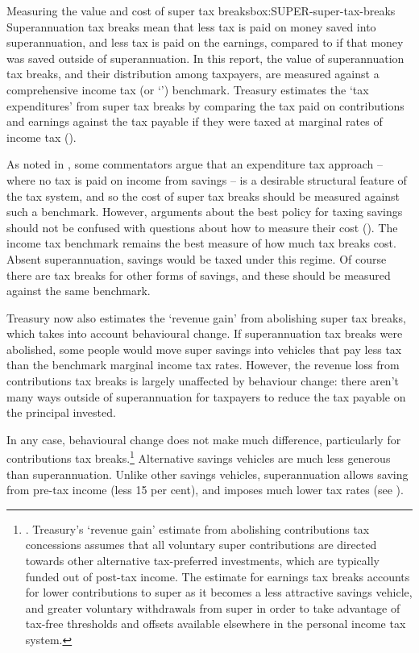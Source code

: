 \begin{smallbox}[tp]{Measuring the value and cost of super tax breaks}{box:SUPER-super-tax-breaks}
Superannuation tax breaks mean that less tax is paid on money saved into superannuation, and less tax is paid on the earnings, compared to if that money was saved outside of superannuation. In this report, the value of superannuation tax breaks, and their distribution among taxpayers, are measured against a comprehensive income tax (or ‘\TTE’) benchmark. Treasury estimates the ‘tax expenditures’ from super tax breaks by comparing the tax paid on contributions and earnings against the tax payable if they were taxed at marginal rates of income tax (\textcite{Treasury2015TES2014}). 

As noted in , some commentators argue that an expenditure tax approach – where no tax is paid on income from savings – is a desirable structural feature of the tax system, and so the cost of super tax breaks should be measured against such a benchmark. However, arguments about the best policy for taxing savings should not be confused with questions about how to measure their cost (\textcite{DaleyWoodCoates2015}). The income tax benchmark remains the best measure of how much tax breaks cost. Absent superannuation, savings would be taxed under this regime. Of course there are tax breaks for other forms of savings, and these should be measured against the same benchmark. 

Treasury now also estimates the ‘revenue gain’ from abolishing super tax breaks, which takes into account behavioural change. If superannuation tax breaks were abolished, some people would move super savings into vehicles that pay less tax than the benchmark marginal income tax rates. However, the revenue loss from contributions tax breaks is largely unaffected by behaviour change: there aren’t many ways outside of superannuation for taxpayers to reduce the tax payable on the principal invested. 
\end{smallbox}

In any case, behavioural change does not make much difference, particularly for contributions tax breaks.\footnote{\textcite[][124]{Treasury2015TES2014}. Treasury’s ‘revenue gain’ estimate from abolishing contributions tax concessions assumes that all voluntary super contributions are directed towards other alternative tax-preferred investments, which are typically funded out of post-tax income. The estimate for earnings tax breaks accounts for lower contributions to super as it becomes a less attractive savings vehicle, and greater voluntary withdrawals from super in order to take advantage of tax-free thresholds and offsets available elsewhere in the personal income tax system.}  
Alternative savings vehicles are much less generous than superannuation. Unlike other savings vehicles, superannuation allows saving from pre-tax income (less 15 per cent), and imposes much lower tax rates (see ). 

